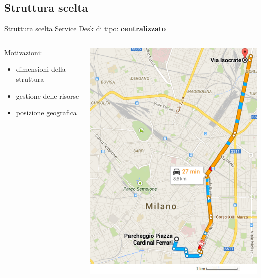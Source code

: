 \subsection*{Struttura scelta}
\begin{frame}{Struttura scelta}
Service Desk di tipo: \textbf{centralizzato}\\
\begin{columns}
\begin{column}{0.6\textwidth}
Motivazioni:
\begin{itemize}
\item{dimensioni della struttura}
\item{gestione delle risorse}
\item{posizione geografica}
\end{itemize}
\end{column}
\begin{column}{0.4\textwidth}
\hspace{10mm}
\centering
\includegraphics[scale=0.4]{Images/Maps.png}
\end{column}
\end{columns}
\end{frame}

